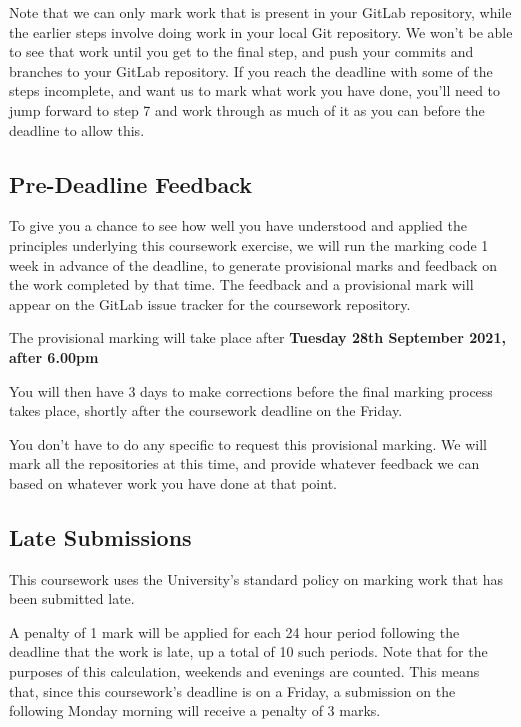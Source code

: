 \documentclass[
]{book}
\begin{document}
Note that we can only mark work that is present in your GitLab repository, while the earlier steps involve doing work in your local Git repository. We won't be able to see that work until you get to the final step, and push your commits and branches to your GitLab repository. If you reach the deadline with some of the steps incomplete, and want us to mark what work you have done, you'll need to jump forward to step 7 and work through as much of it as you can before the deadline to allow this.

\hypertarget{prov}{%
\subsection{Pre-Deadline Feedback}\label{prov}}

To give you a chance to see how well you have understood and applied the principles underlying this coursework exercise, we will run the marking code 1 week in advance of the deadline, to generate provisional marks and feedback on the work completed by that time. The feedback and a provisional mark will appear on the GitLab issue tracker for the coursework repository.

The provisional marking will take place after \textbf{Tuesday 28th September 2021, after 6.00pm}

You will then have 3 days to make corrections before the final marking process takes place, shortly after the coursework deadline on the Friday.

You don't have to do any specific to request this provisional marking. We will mark all the repositories at this time, and provide whatever feedback we can based on whatever work you have done at that point.

\hypertarget{late}{%
\subsection{Late Submissions}\label{late}}

This coursework uses the University's standard policy on marking work that has been submitted late.

A penalty of 1 mark will be applied for each 24 hour period following the deadline that the work is late, up a total of 10 such periods. Note that for the purposes of this calculation, weekends and evenings are counted. This means that, since this coursework's deadline is on a Friday, a submission on the following Monday morning will receive a penalty of 3 marks.
\end{document}

